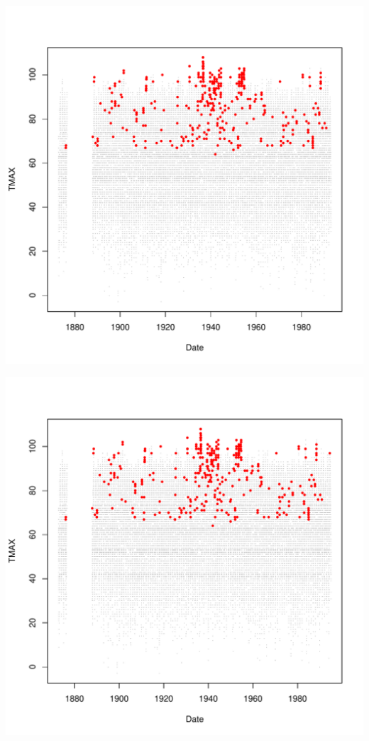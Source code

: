 \documentclass{article}\usepackage[]{graphicx}\usepackage[]{color}
\makeatletter
\def\maxwidth{ %
  \ifdim\Gin@nat@width>\linewidth
    \linewidth
  \else
    \Gin@nat@width
  \fi
}
\newenvironment{knitrout}{}{} %
\makeatother
\begin{document}
\begin{knitrout}
\includegraphics[width=\maxwidth]{figure/unnamed-chunk-4-56} 

\includegraphics[width=\maxwidth]{figure/unnamed-chunk-4-57} 


\end{knitrout}
\end{document}
